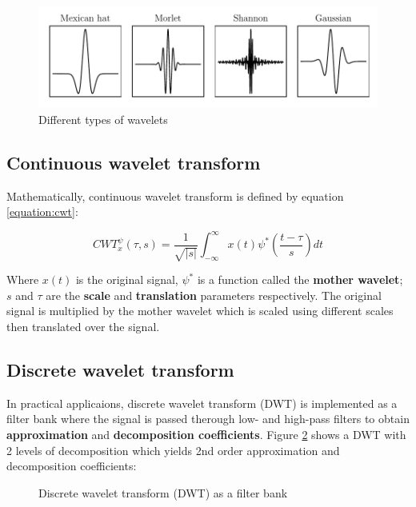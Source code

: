 \begin{figure}[H]
    \centering
    \includegraphics{figures/wavelets.pdf}
    \caption{Different types of wavelets}
    \label{fig:wavelets}
\end{figure}

\subsection{Continuous wavelet transform}
Mathematically, continuous wavelet transform is defined by equation \ref{equation:cwt}:

\begin{equation}
    CWT_x^\psi(\tau, s)=\frac{1}{\sqrt{|s|}}\int_{-\infty}^{\infty}x(t)\psi^* \left(\frac{t-\tau}{s}\right)dt
    \label{equation:cwt}
\end{equation}

Where $x(t)$ is the original signal, $\psi^*$ is a function called the \textbf{mother wavelet}; $s$ and $\tau$ are the \textbf{scale} and \textbf{translation} parameters respectively. The original signal is multiplied by the mother wavelet which is scaled using different scales then translated over the signal.

\subsection{Discrete wavelet transform}
In practical applicaions, discrete wavelet transform (DWT) is implemented as a filter bank where the signal is passed therough low- and high-pass filters to obtain \textbf{approximation} and \textbf{decomposition coefficients}. Figure \ref{fig:dwt} shows a DWT with 2 levels of decomposition which yields 2nd order approximation and decomposition coefficients:

\begin{figure}[H]
    \centering
    
    \caption{Discrete wavelet transform (DWT) as a filter bank}
    \label{fig:dwt}
\end{figure}


